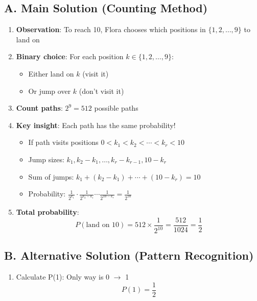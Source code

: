 \documentclass[11pt]{article}
\begin{document}
\begin{solutionbox}
\subsection*{A. Main Solution (Counting Method)}
\begin{enumerate}[leftmargin=*]
    \item \textbf{Observation}: To reach 10, Flora chooses which positions in $\{1,2,\ldots,9\}$ to land on
    
    \item \textbf{Binary choice}: For each position $k \in \{1,2,\ldots,9\}$:
    \begin{itemize}
        \item Either land on $k$ (visit it)
        \item Or jump over $k$ (don't visit it)
    \end{itemize}
    
    \item \textbf{Count paths}: $2^9 = 512$ possible paths
    
    \item \textbf{Key insight}: Each path has the same probability!
    \begin{itemize}
        \item If path visits positions $0 < k_1 < k_2 < \cdots < k_r < 10$
        \item Jump sizes: $k_1, k_2-k_1, \ldots, k_r-k_{r-1}, 10-k_r$
        \item Sum of jumps: $k_1 + (k_2-k_1) + \cdots + (10-k_r) = 10$
        \item Probability: $\frac{1}{2^{k_1}} \cdot \frac{1}{2^{k_2-k_1}} \cdots \frac{1}{2^{10-k_r}} = \frac{1}{2^{10}}$
    \end{itemize}
    
    \item \textbf{Total probability}:
    \[P(\text{land on 10}) = 512 \times \frac{1}{2^{10}} = \frac{512}{1024} = \frac{1}{2}\]
\end{enumerate}

\subsection*{B. Alternative Solution (Pattern Recognition)}
\begin{enumerate}[leftmargin=*]
    \item Calculate P(1): Only way is 0 $\to$ 1
    \[P(1) = \frac{1}{2}\]
    

\end{enumerate}
\end{solutionbox}
\end{document}
